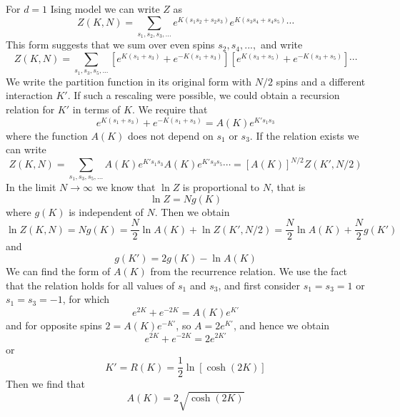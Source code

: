 \documentclass[12pt, a4paper, oneside, openright, titlepage]{book}
\begin{document}
For $d = 1$ Ising model we can write $Z$ as \begin{equation*}
    Z(K,N) = \sum_{s_1,s_2,s_3,...}e^{K(s_1s_2+s_2s_3)}e^{K(s_3s_4+s_4s_5)}\cdots
\end{equation*}
This form suggests that we sum over even spins $s_2,s_4,...,$ and write \begin{equation*}
    Z(K,N) = \sum_{s_1,s_3,s_5,...}\left[e^{K(s_1+s_3)} + e^{-K(s_1+s_3)}\right]\left[e^{K(s_3+s_5)} + e^{-K(s_3+s_5)}\right]\cdots
\end{equation*}
We write the partition function in its original form with $N/2$ spins and a different interaction $K'$. If such a rescaling were possible, we could obtain a recursion relation for $K'$ in terms of $K$. We require that \begin{equation*}
    e^{K(s_1+s_3)} + e^{-K(s_1+s_3)} = A(K)e^{K's_1s_3}
\end{equation*}
where the function $A(K)$ does not depend on $s_1$ or $s_3$. If the relation exists we can write \begin{equation*}
    Z(K,N) = \sum_{s_1,s_3,s_5,...}A(K)e^{K's_1s_3}A(K)e^{K's_3s_5}\cdots = [A(K)]^{N/2}Z(K',N/2)
\end{equation*}
In the limit $N\rightarrow \infty$ we know that $\ln Z$ is proportional to $N$, that is \begin{equation*}
    \ln Z = Ng(K)
\end{equation*}
where $g(K)$ is independent of $N$. Then we obtain \begin{equation*}
    \ln Z(K,N) = Ng(K) = \frac{N}{2}\ln A(K) + \ln Z(K',N/2) = \frac{N}{2}\ln A(K) + \frac{N}{2}g(K')
\end{equation*}
and \begin{equation*}
    g(K') = 2g(K) - \ln A(K)
\end{equation*}
We can find the form of $A(K)$ from the recurrence relation. We use the fact that the relation holds for all values of $s_1$ and $s_3$, and first consider $s_1=s_3 = 1$ or $s_1=s_3 = -1$, for which \begin{equation*}
    e^{2K}  +e^{-2K} = A(K)e^{K'}
\end{equation*}
and for opposite spins $2 = A(K)e^{-K'}$, so $A = 2e^{K'}$, and hence we obtain \begin{equation*}
    e^{2K} + e^{-2K} = 2e^{2K'}
\end{equation*}
or $$K' = R(K) = \frac{1}{2}\ln[\cosh(2K)]$$
Then we find that \begin{equation*}
    A(K) = 2\sqrt{\cosh(2K)}
\end{equation*}
\end{document}
